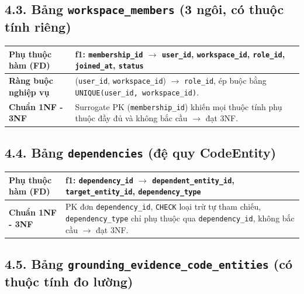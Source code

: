 \vspace{0.5cm}

\subsection*{4.3. Bảng \texttt{workspace\_members} (3 ngôi, có thuộc tính riêng)}

\noindent
\begin{tabularx}{\textwidth}{@{} >{\bfseries}p{3.5cm} X @{}}
\hline
Phụ thuộc hàm (FD) & 
\textbf{f1:} \texttt{membership\_id} $\rightarrow$ \texttt{user\_id}, \texttt{workspace\_id}, \texttt{role\_id}, \texttt{joined\_at}, \texttt{status} \\
\hline
Ràng buộc nghiệp vụ & (\texttt{user\_id}, \texttt{workspace\_id}) $\rightarrow$ \texttt{role\_id}, ép buộc bằng \texttt{UNIQUE(user\_id, workspace\_id)}. \\
\hline
Chuẩn 1NF - 3NF & Surrogate PK (\texttt{membership\_id}) khiến mọi thuộc tính phụ thuộc đầy đủ và không bắc cầu $\rightarrow$ đạt 3NF. \\
\hline
\end{tabularx}

\vspace{0.5cm}

\subsection*{4.4. Bảng \texttt{dependencies} (đệ quy CodeEntity)}

\noindent
\begin{tabularx}{\textwidth}{@{} >{\bfseries}p{3.5cm} X @{}}
\hline
Phụ thuộc hàm (FD) & 
\textbf{f1:} \texttt{dependency\_id} $\rightarrow$ \texttt{dependent\_entity\_id}, \texttt{target\_entity\_id}, \texttt{dependency\_type} \\
\hline
Chuẩn 1NF - 3NF & PK đơn \texttt{dependency\_id}, \texttt{CHECK} loại trừ tự tham chiếu, \texttt{dependency\_type} chỉ phụ thuộc qua \texttt{dependency\_id}, không bắc cầu $\rightarrow$ đạt 3NF. \\
\hline
\end{tabularx}

\vspace{0.5cm}

\subsection*{4.5. Bảng \texttt{grounding\_evidence\_code\_entities} (có thuộc tính đo lường)}

